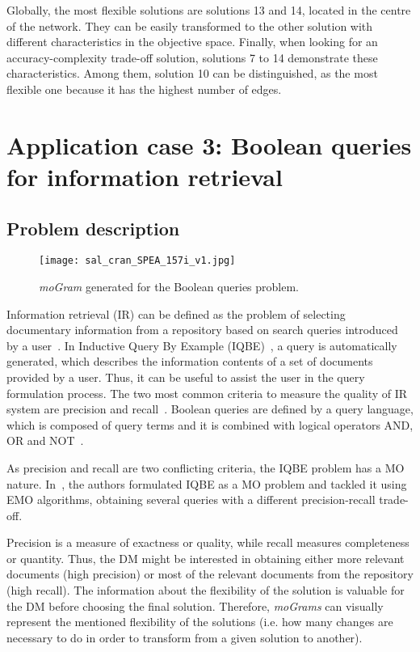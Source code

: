 \documentclass[journal]{IEEEtran}
\begin{document}
Globally, the most flexible solutions are solutions 13 and 14, located in the centre of the network. They can be easily transformed to the other solution with different characteristics in the objective space. 
Finally, when looking for an accuracy-complexity trade-off solution, solutions 7 to 14 demonstrate these characteristics. Among them, solution 10 can be distinguished, as the most flexible one because it has the highest number of edges. 



\section{Application case 3: Boolean queries for information retrieval}
\label{sec:appcase3}


\subsection{Problem description}


\begin{figure*}[htb!]
 \centering
\texttt{[image: sal\_cran\_SPEA\_157i\_v1.jpg]}
\caption{\emph{moGram} generated for the Boolean queries problem.}
\label{fig:booleanQueries}
\end{figure*}

Information retrieval (IR) can be defined as the problem of selecting documentary information from a repository based on search queries introduced by a  user~\cite{Salton86,Baeza-Yates99}.
In Inductive Query By Example (IQBE)~\cite{Chen98}, a query is automatically generated, which describes the information contents of a set of documents provided by a user. Thus, it can be useful to assist the user in the query formulation process. The two most common criteria to measure the quality of IR system are precision and recall~\cite{Rijsbergen79}.
Boolean queries are defined by a query language, which is composed of query terms and it is combined with logical operators AND, OR and NOT~\cite{Rijsbergen79}.

As precision and recall are two conflicting criteria, the IQBE problem has a MO nature. In~\cite{Cordon2006,Herrera09a,Herrera09b}, the authors formulated IQBE as a MO problem and tackled it using EMO algorithms, obtaining several queries with a different precision-recall trade-off.

Precision is a measure of exactness or quality, while recall measures completeness or quantity. Thus, the DM might be interested in obtaining either more relevant documents (high precision) or most of the relevant documents from the repository (high recall). The information about the flexibility of the solution is valuable for the DM before choosing the final solution. Therefore, \emph{moGrams} can visually represent the mentioned flexibility of the solutions (i.e. how many changes are necessary to do in order to transform from a given solution to another).
\end{document}
